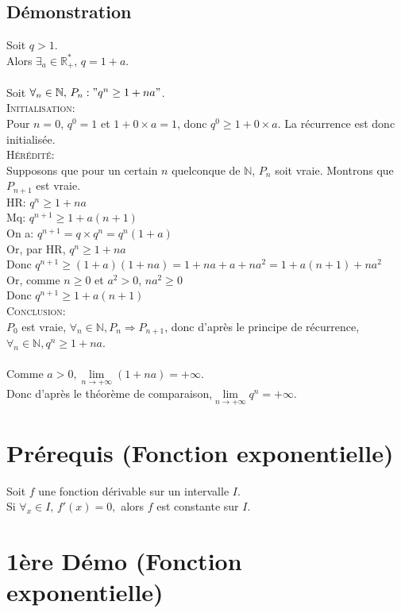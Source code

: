 \documentclass[12px]{article}
\begin{document}
	\subsection{Démonstration}
	Soit $q>1$.\\
	Alors $\exists_a\in\mathbb{R}_+^*, \,q=1+a$.\\
	\\
	Soit $\forall_n\in\mathbb{N}, \,P_n:"q^n\geq 1+na"$.\\
	\textsc{Initialisation:}\\
	Pour $n=0$, $q^0=1$ et $1+0\times a=1$, donc $q^0\geq 1+0\times a$. La récurrence est donc initialisée.\\
	\textsc{Hérédité:}\\
	Supposons que pour un certain $n$ quelconque de $\mathbb{N}$, $P_n$ soit vraie. Montrons que $P_{n+1}$ est vraie.\\
	HR: $q^n \geq 1+na$\\
	Mq: $q^{n+1} \geq 1+a(n+1)$\\
	On a: $q^{n+1}=q\times q^n =q^n(1+a)$\\
	Or, par HR, $q^n \geq 1+na$\\
	Donc $q^{n+1} \geq (1+a)(1+na) = 1+na+a+na^2 = 1+a(n+1)+na^2$\\
	Or, comme $n\geq 0$ et $a^2>0$, $na^2\geq 0$\\
	Donc $q^{n+1}\geq 1+a(n+1)$\\
	\textsc{Conclusion:}\\
	$P_0$ est vraie, $\forall_n\in\mathbb{N},P_n\Rightarrow P_{n+1}$, donc d'après le principe de récurrence, $\forall_n\in\mathbb{N}, q^n\geq 1+na$.\\
	\\
	Comme $a>0, \lim\limits_{n\rightarrow +\infty}(1+na)= +\infty$.\\
	Donc d'après le théorème de comparaison,$ \lim\limits_{n\rightarrow +\infty}q^n=+\infty$.
	
	\section{Prérequis (Fonction exponentielle)}
	Soit $f$ une fonction dérivable sur un intervalle $I$.\\
	Si $\forall_x\in I, \,f'(x)=0,$ alors $f$ est constante sur $I$.
	
	\section{1ère Démo (Fonction exponentielle)}
		
\end{document}
